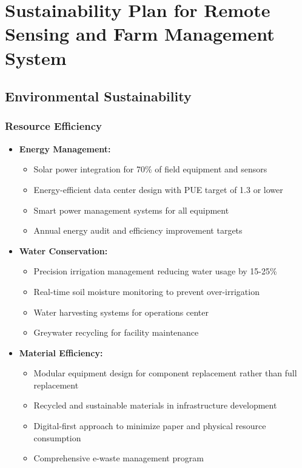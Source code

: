 \section{Sustainability Plan for Remote Sensing and Farm Management System}

\subsection{Environmental Sustainability}

\subsubsection{Resource Efficiency}
\begin{itemize}
    \item \textbf{Energy Management:}
    \begin{itemize}
        \item Solar power integration for 70\% of field equipment and sensors
        \item Energy-efficient data center design with PUE target of 1.3 or lower
        \item Smart power management systems for all equipment
        \item Annual energy audit and efficiency improvement targets
    \end{itemize}
    
    \item \textbf{Water Conservation:}
    \begin{itemize}
        \item Precision irrigation management reducing water usage by 15-25\%
        \item Real-time soil moisture monitoring to prevent over-irrigation
        \item Water harvesting systems for operations center
        \item Greywater recycling for facility maintenance
    \end{itemize}
    
    \item \textbf{Material Efficiency:}
    \begin{itemize}
        \item Modular equipment design for component replacement rather than full replacement
        \item Recycled and sustainable materials in infrastructure development
        \item Digital-first approach to minimize paper and physical resource consumption
        \item Comprehensive e-waste management program
    \end{itemize}
\end{itemize}

